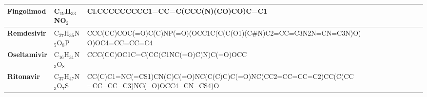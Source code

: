 \documentclass[conference]{IEEEtran}
\begin{document}
\begin{table}[h]
\begin{tabular}{|>{\bfseries}l|l|p{10cm}|}
    \hline
    Fingolimod                               & C$_{19}$H$_{33}$NO$_2$                 & Cl.CCCCCCCCC1=CC=C(CCC(N)(CO)CO)C=C1                                                                                                                                                                                                                                                                                                                                                                                                                                                                                                                                            \\
    \hline
    Remdesivir                               & C$_{27}$H$_{35}$N$_5$O$_8$P            & CCC(CC)COC(=O)C(C)NP(=O)(OCC1C(C(C(O1)(C\#N)C2=CC=C3N2N=CN=C3N)O) \newline O)OC4=CC=CC=C4                                                                                                                                                                                                                                                                                                                                                                                                                                                                                       \\
    \hline
    Oseltamivir                              & C$_{16}$H$_{31}$N$_3$O$_8$             & CCC(CC)OC1C=C(CC(C1NC(=O)C)N)C(=O)OCC                                                                                                                                                                                                                                                                                                                                                                                                                                                                                                                                           \\
    \hline
    Ritonavir                                & C$_{37}$H$_{47}$N$_3$O$_7$S            & CC(C)C1=NC(=CS1)CN(C)C(=O)NC(C(C)C)C(=O)NC(CC2=CC=CC=C2)CC(C(CC \newline 3=CC=CC=C3)NC(=O)OCC4=CN=CS4)O                                                                                                                                                                                                                                                                                                                                                                                                                                                                         \\

\end{tabular}
\end{table}
\end{document}
